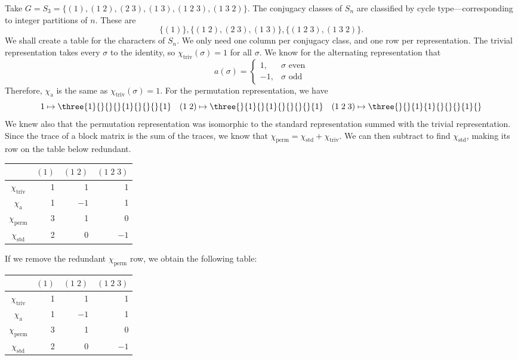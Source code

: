 \begin{ex} %
Take $G=S_3=\{(1),(1\;2),(2\;3),(1\;3),(1\;2\;3),(1\;3\;2)\}$. The conjugacy classes of $S_n$ are classified by cycle type---corresponding to integer partitions of $n$. These are
	\[
	\{(1)\}, \{(1\;2),(2\;3),(1\;3)\}, \{(1\;2\;3),(1\;3\;2)\}.
	\]
We shall create a table for the characters of $S_n$. We only need one column per conjugacy class, and one row per representation. The trivial representation takes every $\sigma$ to the identity, so $\chi_{\text{triv}}(\sigma)=1$ for all $\sigma$. We know for the alternating representation that 
	\[
	a(\sigma)= 
	\begin{cases}
	1, & \sigma \text{ even} \\
	-1, & \sigma \text{ odd}
	\end{cases}
	\]
Therefore, $\chi_{\text{a}}$ is the same as $\chi_{\text{triv}}(\sigma)=1$. For the permutation representation, we have
	\[
	1 \mapsto \three{1}{}{}{}{1}{}{}{}{1} \quad (1\;2) \mapsto \three{}{1}{}{1}{}{}{}{}{1} \quad (1\;2\;3) \mapsto \three{}{}{1}{1}{}{}{}{1}{}
	\]
We knew also that the permutation representation was isomorphic to the standard representation summed with the trivial representation. Since the trace of a block matrix is the sum of the traces, we know that $\chi_{\text{perm}}= \chi_{\text{std}}+\chi_{\text{triv}}$. We can then subtract to find $\chi_{\text{std}}$, making its row on the table below redundant. 
	\begin{table}[h]
	\centering
	\begin{tabular}{c|rrr}
	& $(1)$ & $(1\;2)$ & $(1\;2\;3)$ \\ \hline
	$\chi_{\text{triv}}$ & 1 & 1 & 1 \\
	$\chi_{\text{a}}$ & 1 & $-1$ & 1 \\
	$\chi_{\text{perm}}$ & 3 & 1 & 0 \\
	$\chi_{\text{std}}$ & 2 & 0 & $-1$
	\end{tabular}
	\end{table}
If we remove the redundant $\chi_{\text{perm}}$ row, we obtain the following table:
	\begin{table}[h]
	\centering
	\begin{tabular}{c|rrr}
	& $(1)$ & $(1\;2)$ & $(1\;2\;3)$ \\ \hline
	$\chi_{\text{triv}}$ & 1 & 1 & 1 \\
	$\chi_{\text{a}}$ & 1 & $-1$ & 1 \\
	$\chi_{\text{perm}}$ & 3 & 1 & 0 \\
	$\chi_{\text{std}}$ & 2 & 0 & $-1$

\end{tabular}
\end{table}
\end{ex}
